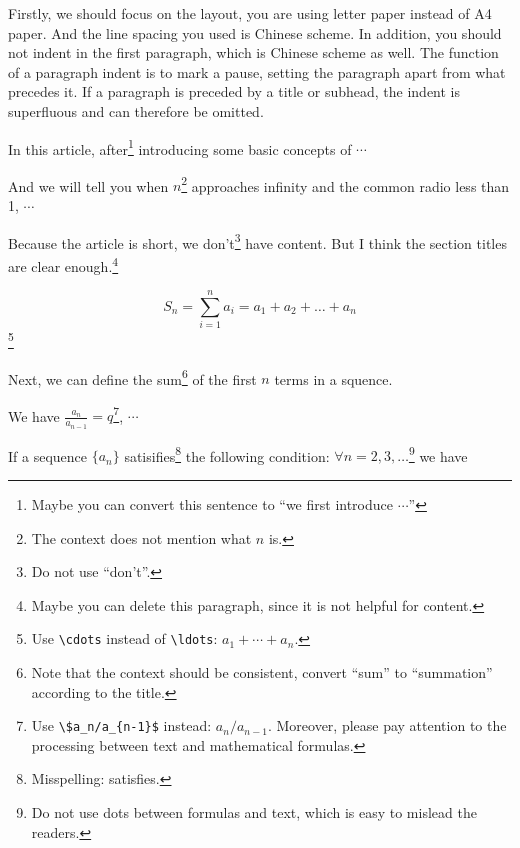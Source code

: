 

Firstly, we should focus on the layout, you are using letter paper instead of A4 paper. And the line spacing you used is Chinese scheme. In addition, you should not indent in the first paragraph, which is Chinese scheme as well. The function of a paragraph indent is to mark a pause, setting the paragraph apart from what precedes it. If a paragraph is preceded by a title or subhead, the indent is superfluous and can therefore be omitted.

\begin{original}
    In this article, after\footnote{Maybe you can convert this sentence to ``we first introduce $\cdots$''} introducing some basic concepts of $\cdots$
\end{original}

\begin{original}
    And we will tell you when $n$\footnote{The context does not mention what $n$ is.} approaches infinity and the common radio less than 1, $\cdots$
    
    Because the article is short, we don't\footnote{Do not use ``don't''.} have content. But I think the section titles are clear enough.\footnote{Maybe you can delete this paragraph, since it is not helpful for content.}
\end{original}

\begin{original}
    \[
        S_n = \sum_{i=1}^{n}a_i = a_1+a_2+\ldots+a_n
    \]\footnote{Use \texttt{\backslash cdots} instead of \texttt{\backslash ldots}: $a_1+\cdots+a_n$.}
\end{original}

\begin{original}
    Next, we can define the sum\footnote{Note that the context should be consistent, convert ``sum'' to ``summation'' according to the title.} of the first $n$ terms in a squence.
\end{original}

\begin{original}
    We have $\frac{a_n}{a_{n-1}}=q$\footnote{Use \texttt{\backslash\$a\_n/a\_\{n-1\}\$} instead: $a_n/a_{n-1}$. Moreover, please pay attention to the processing between text and mathematical formulas.}, $\cdots$
\end{original}

\begin{original}
    If a sequence $\{a_n\}$ satisifies\footnote{Misspelling: satisfies.} the following condition: $\forall n=2,3,\ldots$\footnote{Do not use dots between formulas and text, which is easy to mislead the readers.} we have
\end{original}

